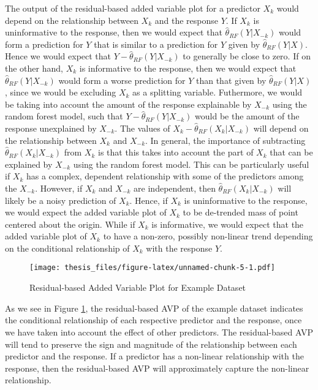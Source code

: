 \documentclass[12pt,twoside]{reedthesis}
\theoremstyle{definition}
\theoremstyle{definition}
\theoremstyle{definition}
\theoremstyle{remark}
\begin{document}
The output of the residual-based added variable plot for a predictor
\(X_k\) would depend on the relationship between \(X_k\) and the
response \(Y\). If \(X_k\) is uninformative to the response, then we
would expect that \(\hat{\theta}_{RF}(Y|X_{-k})\) would form a
prediction for \(Y\) that is similar to a prediction for \(Y\) given by
\(\hat{\theta}_{RF}(Y|X)\). Hence we would expect that
\(Y-\hat{\theta}_{RF}(Y|X_{-k})\) to generally be close to zero. If on
the other hand, \(X_k\) is informative to the response, then we would
expect that \(\hat{\theta}_{RF}(Y|X_{-k})\) would form a worse
prediction for \(Y\) than that given by \(\hat{\theta}_{RF}(Y|X)\),
since we would be excluding \(X_k\) as a splitting variable. Futhermore,
we would be taking into account the amount of the response explainable
by \(X_{-k}\) using the random forest model, such that
\(Y-\hat{\theta}_{RF}(Y|X_{-k})\) would be the amount of the response
unexplained by \(X_{-k}\). The values of
\(X_k-\hat{\theta}_{RF}(X_k|X_{-k})\) will depend on the relationship
between \(X_k\) and \(X_{-k}\). In general, the importance of
subtracting \(\hat{\theta}_{RF}(X_k|X_{-k})\) from \(X_k\) is that this
takes into account the part of \(X_k\) that can be explained by
\(X_{-k}\) using the random forest model. This can be particularly
useful if \(X_k\) has a complex, dependent relationship with some of the
predictors among the \(X_{-k}\). However, if \(X_k\) and \(X_{-k}\) are
independent, then \(\hat{\theta}_{RF}(X_k|X_{-k})\) will likely be a
noisy prediction of \(X_k\). Hence, if \(X_k\) is uninformative to the
response, we would expect the added variable plot of \(X_k\) to be
de-trended mass of point centered about the origin. While if \(X_k\) is
informative, we would expect that the added variable plot of \(X_k\) to
have a non-zero, possibly non-linear trend depending on the conditional
relationship of \(X_k\) with the response \(Y\). \par
\begin{figure}
\centering
\texttt{[image: thesis\_files/figure-latex/unnamed-chunk-5-1.pdf]}
\caption{\label{fig:unnamed-chunk-5}\label{AVPresex}Residual-based Added
Variable Plot for Example Dataset}
\end{figure}
As we see in Figure \ref{AVPresex}, the residual-based AVP of the
example dataset indicates the conditional relationship of each
respective predictor and the response, once we have taken into account
the effect of other predictors. The residual-based AVP will tend to
preserve the sign and magnitude of the relationship between each
predictor and the response. If a predictor has a non-linear relationship
with the response, then the residual-based AVP will approximately
capture the non-linear relationship.
\end{document}

